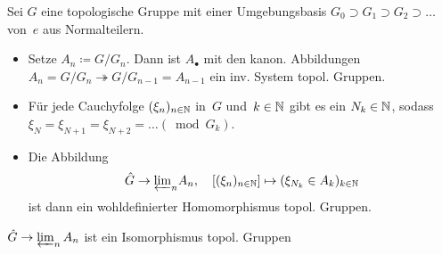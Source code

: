 \documentclass{cheat-sheet}
\newcommand{\thra}{\twoheadrightarrow}
\begin{document}
\begin{konstr}
  Sei $G$ eine topologische Gruppe mit einer Umgebungsbasis $G_0 \supset G_1 \supset G_2 \supset \ldots$ von~$e$ aus Normalteilern.
  \begin{itemize}
    \item Setze $A_n \coloneqq G/G_n$.
    Dann ist $A_\bullet$ mit den kanon. Abbildungen $A_n = G / G_n \thra G / G_{n-1} = A_{n-1}$ ein inv. System topol. Gruppen.
    \item Für jede Cauchyfolge $(\xi_n)_{n \in \mathbb{N}}$ in~$G$ und~$k \in \mathbb{N}$ gibt es ein $N_k \in \mathbb{N}$, sodass $\xi_N = \xi_{N+1} = \xi_{N+2} = \ldots (\bmod{G_k})$.
    \item Die Abbildung
    \[
      \hat{G} \to {\varprojlim}_{n} A_n, \quad
      [(\xi_n)_{n \in \mathbb{N}}] \mapsto (\xi_{N_k} \in A_k)_{k \in \mathbb{N}}
    \]
    ist dann ein wohldefinierter Homomorphismus topol. Gruppen.
  \end{itemize}
\end{konstr}

\begin{prop}
  $\hat{G} \to \varprojlim_{n} A_n$ ist ein Isomorphismus topol. Gruppen
\end{prop}

















\end{document}
